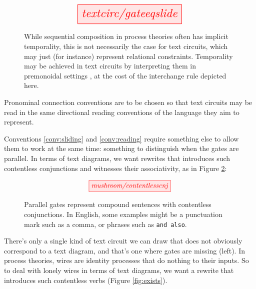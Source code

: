 \begin{figure}[h!]\label{fig:sliding}
\centering
\[
\resizebox{0.5\textwidth}{!}{\tikzfig{textcirc/gateeqslide}} 
\]
\caption{While sequential composition in process theories often has implicit temporality, this is not necessarily the case for text circuits, which may just (for instance) represent relational constraints. Temporality may be achieved in text circuits by interpreting them in premonoidal settings \citep{jeffreyPremonoidalCategoriesFlow1998}, at the cost of the interchange rule depicted here.}
\end{figure}

\vspace{1cm}

\begin{convention}\label{conv:reading}
Pronominal connection conventions are to be chosen so that text circuits may be read in the same directional reading conventions of the language they aim to represent.
\end{convention}

\begin{convention}\label{conv:and}
Conventions \ref{conv:sliding} and \ref{conv:reading} require something else to allow them to work at the same time: something to distinguish when the gates are parallel. In terms of text diagrams, we want rewrites that introduces such contentless conjunctions and witnesses their associativity, as in Figure \ref{fig:contentlessCNJ}:
\end{convention}

\begin{figure}[h!]\label{fig:contentlessCNJ}
\centering
\[
\tikzfig{mushroom/contentlesscnj}
\]
\caption{
Parallel gates represent compound sentences with contentless conjunctions. In English, some examples might be a punctuation mark such as a comma, or phrases such as \texttt{and also}.
}
\end{figure}

\begin{convention}\label{conv:exists}
There's only a single kind of text circuit we can draw that does not obviously correspond to a text diagram, and that's one where gates are missing (left). In process theories, wires are identity processes that do nothing to their inputs. So to deal with lonely wires in terms of text diagrams, we want a rewrite that introduces such contentless verbs (Figure \ref{fig:exists}).
\end{convention}

